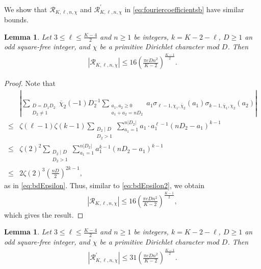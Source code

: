 \documentclass[11pt,letterpaper,reqno]{amsart}
\numberwithin{figure}{section}
\numberwithin{table}{section}
\theoremstyle{definition}
\theoremstyle{plain}
\newtheorem{lemma}[theorem]{Lemma}
\theoremstyle{definition}
\theoremstyle{definition}
\theoremstyle{remark}
\numberwithin{equation}{section}
\theoremstyle{remark}
\begin{document}
We show that $\mathscr{R}_{K,\ell,n,\chi}$ and $\mathscr{R}^{\prime}_{K,\ell,n,\chi}$  in \eqref{eq:fouriercoefficientsb} have similar bounds.
\begin{lemma}\label{lem:bdfrakR}
       Let $3\leq\ell\leq\frac{K-4}{2}$ and $n\geq1$ be integers, $k=K-2-\ell$, $D\geq1$ an odd square-free integer, and $\chi$ be a primitive Dirichlet character mod $D$. Then
    \begin{align*}
        |\mathscr{R}_{K,\ell,n,\chi}|\leq 16\left(\frac{\pi eDn^2}{K-2}\right)^{\frac{K-1}{2}}.
    \end{align*}
\end{lemma}
\begin{proof}Note that 
        \begin{align*}
        &\left|\sum\limits_{\substack{D=D_1D_2\\D_2\neq 1}}
\overline{\chi}_2(-1)D_2^{-1}\sum\limits_{\substack{a_1,a_2\geq0\\a_1+a_2=nD_2}}a_1\sigma_{\ell-1,\chi_1,\overline{\chi}_{2}}(a_1)\sigma_{k-1,\overline{\chi}_{1},\chi_2}(a_2)\right|\\\leq&\zeta(\ell-1)\zeta(k-1)\sum_{\substack{D_2\mid D\\D_2>1}}\sum_{a_1=1}^{n|D_2|}a_1\cdot a_1^{\ell-1}(nD_2-a_1)^{k-1}\\\leq&\zeta(2)^2\sum_{\substack{D_2\mid D\\D_2>1}}\sum_{a_1=1}^{n|D_2|}a_1^{k-1}(nD_2-a_1)^{k-1}\\
      \leq&2\zeta(2)^3\left(\frac{nD}{2}\right)^{2k-1},
    \end{align*}
as in \eqref{eq:bdEpsilon}. Thus, similar to \eqref{eq:bdEpsilon2}, we obtain
\begin{align*}|\mathscr{R}_{K,\ell,n,\chi}|
\leq16\left(\frac{\pi eDn^2}{K-2}\right)^{\frac{K-1}{2}},
\end{align*}
which gives the result.
\end{proof}
\begin{lemma}\label{lem:bdmathfrakRprime}
       Let $3\leq\ell\leq\frac{K-4}{2}$ and $n\geq1$  be integers, $k=K-2-\ell$, $D\geq1$ an odd square-free integer, and $\chi$ be a primitive Dirichlet character mod $D$. Then
    \begin{align}  |\mathscr{R}^{\prime}_{K,\ell,n,\chi}|\leq31\left(\frac{\pi eDn^2}{K-2}\right)^{\frac{K-1}{2}}.
    \end{align}
\end{lemma}
\end{document}
